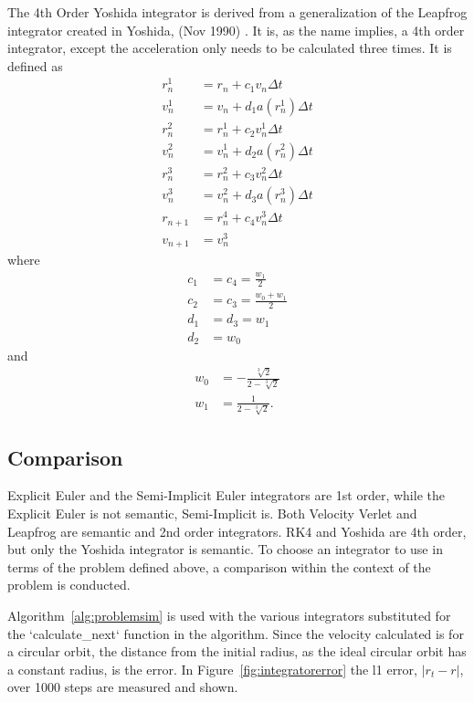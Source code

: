 The 4th Order Yoshida integrator is derived from a generalization of the Leapfrog integrator created in Yoshida, (Nov 1990) \cite{yoshida_1990}. It is, as the name implies, a 4th order integrator, except the acceleration only needs to be calculated three times. It is defined as 
\begin{align*}
r_n^1 &= r_n + c_1 v_n \Delta t \\
v_n^1 &= v_n + d_1 a(r_n^1) \Delta t \\
r_n^2 &= r_n^1 + c_2 v_n^1 \Delta t \\
v_n^2 &= v_n^1 + d_2 a(r_n^2) \Delta t \\
r_n^3 &= r_n^2 + c_3 v_n^2 \Delta t \\
v_n^3 &= v_n^2 + d_3 a(r_n^3) \Delta t \\
r_{n+1} &= r_n^4 + c_4 v_n^3 \Delta t \\
v_{n+1} &= v_n^3
\end{align*}
where 
\begin{align*}
c_1&=c_4=\frac{w_1}{2} \\
c_2&=c_3=\frac{w_0+w_1}{2}\\
d_1&=d_3=w_1\\
d_2&=w_0
\end{align*}
and
\begin{align*}
w_0&=-\frac{\sqrt[3]{2}}{2-\sqrt[3]{2}}\\
w_1&=\frac{1}{2-\sqrt[3]{2}}.
\end{align*}

\subsection{Comparison}

Explicit Euler and the Semi-Implicit Euler integrators are 1st order, while the Explicit Euler is not semantic, Semi-Implicit is. Both Velocity Verlet and Leapfrog are semantic and 2nd order integrators. RK4 and Yoshida are 4th order, but only the Yoshida integrator is semantic. To choose an integrator to use in terms of the problem defined above, a comparison within the context of the problem is conducted. 

Algorithm~\ref{alg:problemsim} is used with the various integrators substituted for the `calculate\_next` function in the algorithm. Since the velocity calculated is for a circular orbit, the distance from the initial radius, as the ideal circular orbit has a constant radius, is the error. In Figure~\ref{fig:integratorerror} the l1 error, $|r_t-r|$, over 1000 steps are measured and shown. 

